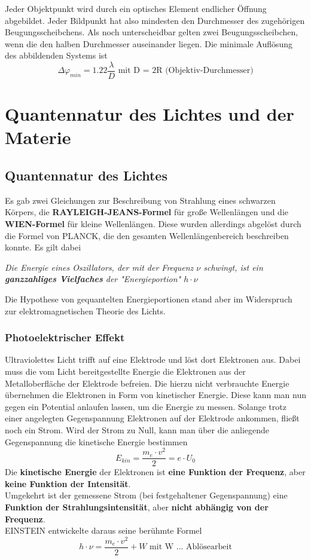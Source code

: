 \documentclass[12pt,a4paper,ngerman]{article}
\begin{document}
Jeder Objektpunkt wird durch ein optisches Element endlicher Öffnung abgebildet. Jeder Bildpunkt hat also mindesten den Durchmesser des zugehörigen Beugungsscheibchens. Als noch unterscheidbar gelten zwei Beugungsscheibchen, wenn die den halben Durchmesser auseinander liegen. Die minimale Auflösung des abbildenden Systems ist 
\begin{equation}
\Delta \varphi_{min} = 1.22 \frac{\lambda}{D} \text{ mit D = 2R (Objektiv-Durchmesser)}
\end{equation}

\pagebreak

\section{Quantennatur des Lichtes und der Materie}
\subsection{Quantennatur des Lichtes}
Es gab zwei Gleichungen zur Beschreibung von Strahlung eines schwarzen Körpers, die \textbf{RAYLEIGH-JEANS-Formel} für große Wellenlängen und die \textbf{WIEN-Formel} für kleine Wellenlängen. Diese wurden allerdings abgelöst durch die Formel von PLANCK, die den gesamten Wellenlängenbereich beschreiben konnte. Es gilt dabei
\begin{center}
\textit{Die Energie eines Oszillators, der mit der Frequenz $\nu$ schwingt, ist ein \textbf{ganzzahliges Vielfaches} der "Energieportion" $h \cdot \nu$}
\end{center}

Die Hypothese von gequantelten Energieportionen stand aber im Widerspruch zur elektromagnetischen Theorie des Lichts. 
\subsubsection{Photoelektrischer Effekt}
Ultraviolettes Licht trifft auf eine Elektrode und löst dort Elektronen aus. Dabei muss die vom Licht bereitgestellte Energie die Elektronen aus der Metalloberfläche der Elektrode befreien. Die hierzu nicht verbrauchte Energie übernehmen die Elektronen in Form von kinetischer Energie. Diese kann man nun gegen ein Potential anlaufen lassen, um die Energie zu messen. Solange trotz einer angelegten Gegenspannung Elektronen auf der Elektrode ankommen, fließt noch ein Strom. Wird der Strom zu Null, kann man über die anliegende Gegenspannung die kinetische Energie bestimmen
\begin{equation}
E_{kin} = \frac{m_e \cdot v^2}{2} = e \cdot U_0
\end{equation}
Die \textbf{kinetische Energie} der Elektronen ist \textbf{eine Funktion der Frequenz}, aber \textbf{keine Funktion der Intensität}. \\
 Umgekehrt ist der gemessene Strom (bei festgehaltener Gegenspannung) eine \textbf{Funktion der Strahlungsintensität}, aber \textbf{nicht abhängig von der Frequenz}. \\
EINSTEIN entwickelte daraus seine berühmte Formel
\begin{equation}
h \cdot \nu = \frac{m_e \cdot v^2}{2} + W \text{ mit W ... Ablösearbeit}
\end{equation}
\end{document}
